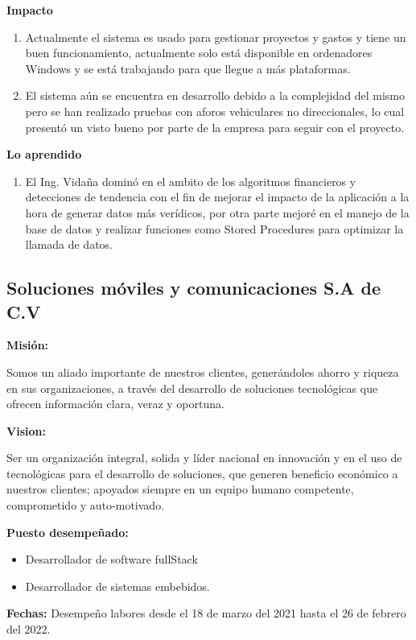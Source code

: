\documentclass[protocolo.tex]{subfiles}
\begin{document}
\textbf{Impacto}
\begin{enumerate}
\item Actualmente el sistema es usado para gestionar proyectos y gastos y tiene un buen funcionamiento, actualmente solo está disponible en ordenadores Windows y se está trabajando para que llegue a más plataformas.
\item El sistema aún se encuentra en desarrollo debido a la complejidad del mismo pero se han realizado pruebas con aforos vehiculares no direccionales, lo cual presentó un visto bueno por parte de la empresa para seguir con el proyecto.
\end{enumerate}

\textbf{Lo aprendido}
\begin{enumerate}
\item El Ing. Vidaña dominó en el ambito de los algoritmos financieros y detecciones de tendencia con el fin de mejorar el impacto de la aplicación a la hora de generar datos más verídicos, por otra parte mejoré en el manejo de la base de datos y realizar funciones como Stored Procedures para optimizar la llamada de datos.
\end{enumerate}

\vfill %
\subsection{Soluciones móviles y comunicaciones S.A de C.V}

\textbf{Misión:}

Somos un aliado importante de nuestros clientes, generándoles ahorro y riqueza en sus organizaciones, a través del desarrollo de soluciones tecnológicas que ofrecen información clara, veraz y oportuna.


\textbf{Vision:}

Ser un organización integral, solida y líder nacional en innovación y en el uso de tecnológicas para el desarrollo de soluciones, que generen beneficio económico a nuestros clientes; apoyados siempre en un equipo humano competente, comprometido y auto-motivado.


\textbf{Puesto desempeñado:} 
\begin{itemize}
\item Desarrollador de software fullStack
\item Desarrollador de sistemas embebidos.
\end{itemize}

\textbf{Fechas:}
Desempeño labores desde el 18 de marzo del 2021 hasta el 26 de febrero del 2022.
\end{document}
